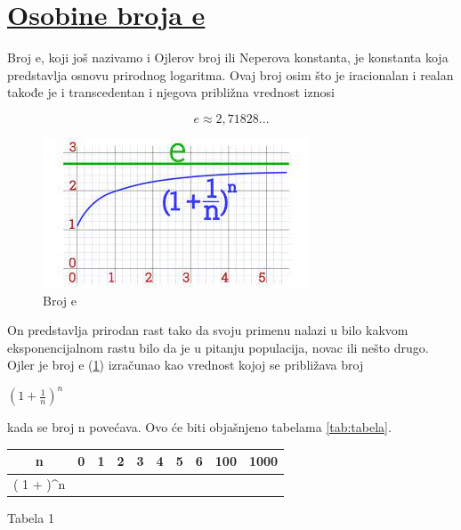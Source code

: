 \documentclass{article}
\begin{document}
	\section*{\underline{Osobine broja e}}
	
	
	Broj e, koji još nazivamo i Ojlerov broj ili Neperova konstanta, je konstanta koja predstavlja osnovu prirodnog logaritma. Ovaj broj osim što je iracionalan i realan takođe je i transcedentan i njegova približna vrednost iznosi
	
	
	\begingroup
	\centering
	\[ e\approx 2,71828...\]
	\endgroup
	\vspace{5mm}
	
	\begin{figure}
		\includegraphics[scale = 0.5]{image.png}
		\caption{Broj e}
		\label{fig:br}
	\end{figure}
	On predstavlja prirodan rast tako da svoju primenu nalazi u bilo kakvom eksponencijalnom rastu bilo da je u pitanju populacija, novac ili nešto drugo. Ojler je broj e (\ref{fig:br}) izračunao kao vrednost kojoj se približava broj
	\newline
	
	\begingroup
	\centering
	
	$( 1 + \frac{1}{n} )^n$
	
	\endgroup 
	\vspace{5mm}
	
	kada se broj n povećava. Ovo će biti objašnjeno tabelama \ref{tab:tabela}. 
	\vspace{3cm}
	
	\begin{center}

           
		\begin{tabular}{|c|c|c|c|c|c|c|c|c|c|}
			\hline 
			n & 0 & 1 & 2 & 3 & 4 & 5 & 6 & 100 & 1000 \\
			\hline
			\left( 1 + \frac{1}{n} )^n &   &   &   &   &   &   &   &   &   \\
			\hline
   
		\end{tabular}
            \caption{Tabela 1}
          \label{tab:tabela}
	\end{center}
	
\end{document}
